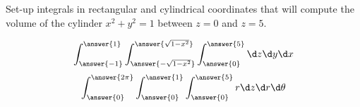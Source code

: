 \documentclass{ximera}
\author{Bart Snapp}
\begin{document}
\begin{exercise}
  Set-up integrals in rectangular and cylindrical coordinates that
  will compute the volume of the cylinder $x^2+y^2=1$ between $z=0$
  and $z=5$.
  \begin{prompt}
  \[
  \int_{\answer{-1}}^{\answer{1}}\int_{\answer{-\sqrt{1-x^2}}}^{\answer{\sqrt{1-x^2}}}\int_{\answer{0}}^{\answer{5}}\d z \d y \d x
  \]
  \[
  \int_{\answer{0}}^{\answer{2\pi}}\int_{\answer{0}}^{\answer{1}}\int_{\answer{0}}^{\answer{5}}   r\d z \d r \d \theta
  \]
  \end{prompt}
\end{exercise}
\end{document}
